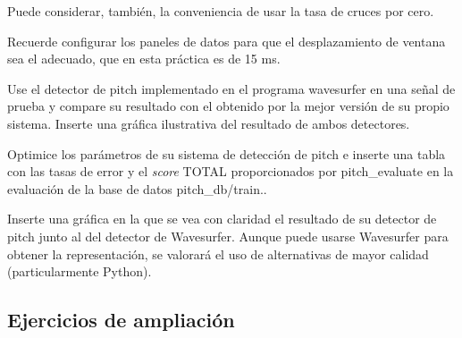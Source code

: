 \begin{DoxyItemize}
\begin{DoxyItemize}
\begin{DoxyItemize}
Puede considerar, también, la conveniencia de usar la tasa de cruces por cero.

Recuerde configurar los paneles de datos para que el desplazamiento de ventana sea el adecuado, que en esta práctica es de 15 ms.
\item Use el detector de pitch implementado en el programa {\ttfamily wavesurfer} en una señal de prueba y compare su resultado con el obtenido por la mejor versión de su propio sistema. Inserte una gráfica ilustrativa del resultado de ambos detectores.
\end{DoxyItemize}
\item Optimice los parámetros de su sistema de detección de pitch e inserte una tabla con las tasas de error y el {\itshape score} T\+O\+T\+AL proporcionados por {\ttfamily pitch\+\_\+evaluate} en la evaluación de la base de datos {\ttfamily pitch\+\_\+db/train}..
\begin{DoxyItemize}
\item Inserte una gráfica en la que se vea con claridad el resultado de su detector de pitch junto al del detector de Wavesurfer. Aunque puede usarse Wavesurfer para obtener la representación, se valorará el uso de alternativas de mayor calidad (particularmente Python).
\end{DoxyItemize}
\end{DoxyItemize}
\end{DoxyItemize}

\subsection*{Ejercicios de ampliación }


